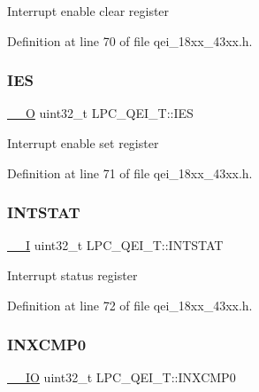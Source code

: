 Interrupt enable clear register 

Definition at line 70 of file qei\+\_\+18xx\+\_\+43xx.\+h.

\mbox{\label{struct_l_p_c___q_e_i___t_a2eab592cbea507455a7aaab9a5ab6d53}} 
\subsubsection{\texorpdfstring{I\+ES}{IES}}
{\footnotesize\ttfamily \hyperlink{core__sc300_8h_a7e25d9380f9ef903923964322e71f2f6}{\+\_\+\+\_\+O} uint32\+\_\+t L\+P\+C\+\_\+\+Q\+E\+I\+\_\+\+T\+::\+I\+ES}

Interrupt enable set register 

Definition at line 71 of file qei\+\_\+18xx\+\_\+43xx.\+h.

\mbox{\label{struct_l_p_c___q_e_i___t_a550a4e26c5e38589e8722dc3064478a5}} 
\subsubsection{\texorpdfstring{I\+N\+T\+S\+T\+AT}{INTSTAT}}
{\footnotesize\ttfamily \hyperlink{core__sc300_8h_af63697ed9952cc71e1225efe205f6cd3}{\+\_\+\+\_\+I} uint32\+\_\+t L\+P\+C\+\_\+\+Q\+E\+I\+\_\+\+T\+::\+I\+N\+T\+S\+T\+AT}

Interrupt status register 

Definition at line 72 of file qei\+\_\+18xx\+\_\+43xx.\+h.

\mbox{\label{struct_l_p_c___q_e_i___t_abb45974ac42d27676c2b3c08d9f9aad0}} 
\subsubsection{\texorpdfstring{I\+N\+X\+C\+M\+P0}{INXCMP0}}
{\footnotesize\ttfamily \hyperlink{core__sc300_8h_aec43007d9998a0a0e01faede4133d6be}{\+\_\+\+\_\+\+IO} uint32\+\_\+t L\+P\+C\+\_\+\+Q\+E\+I\+\_\+\+T\+::\+I\+N\+X\+C\+M\+P0}

